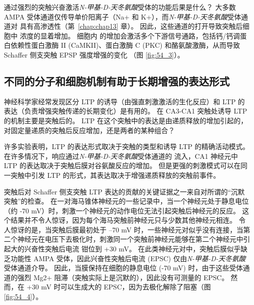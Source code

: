 通过强烈的突触兴奋激活\textit{N-甲基-D-天冬氨酸}受体的功能后果是什么？
大多数 AMPA 受体通道仅传导单价阳离子（Na+ 和 K+），而\textit{N-甲基-D-天冬氨酸}受体通道对  具有高渗透性（第~\ref{chap:chap13} 章）。
因此，这些通道的打开导致突触后细胞中  浓度的显着增加。
细胞内  的增加会激活多个下游信号通路，包括钙/钙调蛋白依赖性蛋白激酶 II (CaMKII)、蛋白激酶 C (PKC) 和酪氨酸激酶，从而导致 Schaffer 侧支突触 EPSP 强度增强的变化 （图 \ref{fig:54_3}）。



\subsection{不同的分子和细胞机制有助于长期增强的表达形式}

神经科学家经常发现区分 LTP 的诱导（由强直刺激激活的生化反应）和 LTP 的表达（负责增强突触传递的长期变化）是有用的。
在 CA3-CA1 突触处诱导 LTP 的机制主要是突触后的。
LTP 在这个突触中的表达是由递质释放的增加引起的，对固定量递质的突触后反应增加，还是两者的某种组合？


许多实验表明，LTP 的表达形式取决于突触的类型和诱导 LTP 的精确活动模式。
在许多情况下，响应通过\textit{N-甲基-D-天冬氨酸}受体通道的  流入，CA1 神经元中 LTP 的表达取决于突触后膜对谷氨酸反应的增加。
但是更强的刺激模式可以在同一突触中引发 LTP 的形式，其表达取决于增强递质释放的突触前事件。


突触后对 Schaffer 侧支突触 LTP 表达的贡献的关键证据之一来自对所谓的“沉默突触”的检查。
在一对海马锥体神经元的一些记录中，当一个神经元处于静息电位（约 -70 mV）时，刺激一个神经元的动作电位无法引起突触后神经元的反应。
这个结果并不令人惊讶，因为每个海马突触前神经元只与少数其他神经元相连。
令人惊讶的是，当突触后膜最初处于 –70 mV 时，一些神经元对似乎没有连接，当第二个神经元在电压下去极化时，刺激同一个突触前神经元能够在第二个神经元中引起大的兴奋性突触后电流 钳位到 +30 mV。
在此类神经元对中，突触后膜似乎缺乏功能性 AMPA 受体，因此兴奋性突触后电流 (EPSC) 仅由\textit{N-甲基-D-天冬氨酸}受体通道介导。
因此，当膜保持在细胞的静息电位 (-70 mV) 时，由于这些受体通道的强烈 Mg2+ 阻滞（突触实际上是沉默的），因此没有可测量的 EPSC。
然而，在 +30 mV 时可以生成大的 EPSC，因为去极化解除了阻塞（图 \ref{fig:54_4}）。


